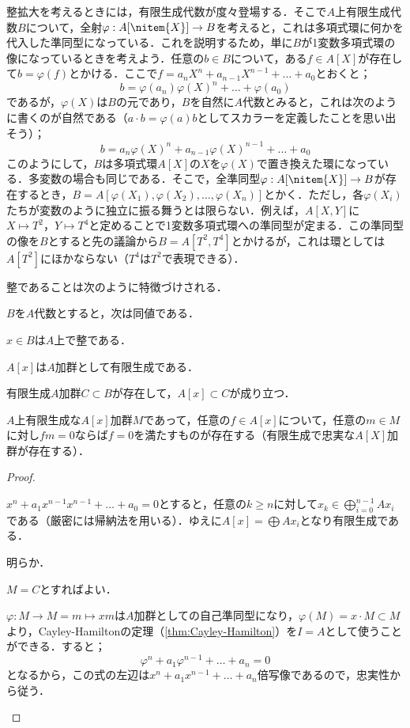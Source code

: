 整拡大を考えるときには，有限生成代数が度々登場する．そこで$A$上有限生成代数$B$について，全射$\varphi:A[\nitem{X}]\to B$を考えると，これは多項式環に何かを代入した準同型になっている．これを説明するため，単に$B$が1変数多項式環の像になっているときを考えよう．任意の$b\in B$について，ある$f\in A[X]$が存在して$b=\varphi(f)$とかける．ここで$f=a_nX^n+a_{n-1}X^{n-1}+\dots+a_0$とおくと；
\[b=\varphi(a_n)\varphi(X)^n+\dots+\varphi(a_0)\]
であるが，$\varphi(X)$は$B$の元であり，$B$を自然に$A$代数とみると，これは次のように書くのが自然である（$a\cdot b=\varphi(a)b$としてスカラーを定義したことを思い出そう）；
\[b=a_n\varphi(X)^n+a_{n-1}\varphi(X)^{n-1}+\dots+a_0\]
このようにして，$B$は多項式環$A[X]$の$X$を$\varphi(X)$で置き換えた環になっている．多変数の場合も同じである．そこで，全準同型$\varphi:A[\nitem{X}]\to B$が存在するとき，$B=A[\varphi(X_1),\varphi(X_2),\dots,\varphi(X_n)]$とかく．ただし，各$\varphi(X_i)$たちが変数のように独立に振る舞うとは限らない．例えば，$A[X,Y]$に$X\mapsto T^2，Y\mapsto T^4$と定めることで1変数多項式環への準同型が定まる．この準同型の像を$B$とすると先の議論から$B=A[T^2,T^4]$とかけるが，これは環としては$A[T^2]$にほかならない（$T^4$は$T^2$で表現できる）．

整であることは次のように特徴づけされる．
\begin{prop}\label{prop:整拡大の特徴づけ}
	$B$を$A$代数とすると，次は同値である．
	\begin{sakura}
		\item	$x\in B$は$A$上で整である．
		\item	$A[x]$は$A$加群として有限生成である．
		\item	有限生成$A$加群$C\subset B$が存在して，$A[x]\subset C$が成り立つ．
		\item	$A$上有限生成な$A[x]$加群$M$であって，任意の$f\in A[x]$について，任意の$m\in M$に対し$fm=0$ならば$f=0$を満たすものが存在する（有限生成で忠実な$A[X]$加群が存在する）．
	\end{sakura}
\end{prop}
\begin{proof}
	\begin{eqv}[4]
		\item $x^n+a_1x^{n-1}x^{n-1}+\dots+a_0=0$とすると，任意の$k\geq n$に対して$x_k\in \bigoplus_{i=0}^{n-1}Ax_i$である（厳密には帰納法を用いる）．ゆえに$A[x]=\bigoplus Ax_i$となり有限生成である．
		
		\item 明らか．
		\item $M=C$とすればよい．
		\item $\varphi:M\to M=m\mapsto xm$は$A$加群としての自己準同型になり，$\varphi(M)=x\cdot M\subset M$より，Cayley-Hamiltonの定理（\ref{thm:Cayley-Hamilton}）を$I=A$として使うことができる．すると；
		\[\varphi^n+a_1\varphi^{n-1}+\dots+a_n=0\]
		となるから，この式の左辺は$x^n+a_1x^{n-1}+\dots+a_n$倍写像であるので，忠実性から従う．
	\end{eqv}
\end{proof}

